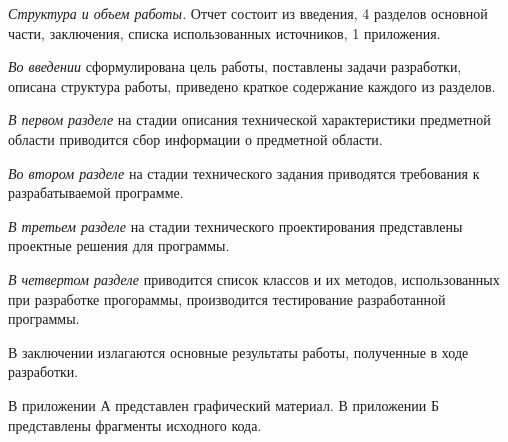 \emph{Структура и объем работы.} Отчет состоит из введения, 4 разделов основной части, заключения, списка использованных источников, 1 приложения. 

\emph{Во введении} сформулирована цель работы, поставлены задачи разработки, описана структура работы, приведено краткое содержание каждого из разделов.

\emph{В первом разделе} на стадии описания технической характеристики предметной области приводится сбор информации о предметной области.

\emph{Во втором разделе} на стадии технического задания приводятся требования к разрабатываемой программе.

\emph{В третьем разделе} на стадии технического проектирования представлены проектные решения для программы.

\emph{В четвертом разделе} приводится список классов и их методов, использованных при разработке прогораммы, производится тестирование разработанной программы.

В заключении излагаются основные результаты работы, полученные в ходе разработки.

В приложении А представлен графический материал.
В приложении Б представлены фрагменты исходного кода. 
